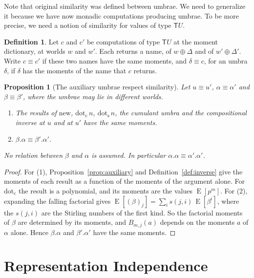 \documentclass[11pt,a4paper]{report}
\theoremstyle{plain}
\newtheorem{proposition}[theorem]{Proposition}
\theoremstyle{definition}
\newtheorem{definition}[theorem]{Definition}
\theoremstyle{remark}
\newcommand{\E}{\operatorname{E}}
\newcommand{\T}{\mathsf{T}}
\begin{document}
Note that original similarity was defined between umbrae. We need to 
generalize it because we have now monadic computations producing umbrae.
To be more precise, we need a notion of similarity for values of type $\T U$.

\begin{definition}
\label{def:similar-comp}
Let $c$ and $c'$ be computations of type $\T U$ at the moment dictionary, at
worlds $w$ and $w'$. Each returns a name, of $w \oplus \Delta$ and of
$w' \oplus \Delta'$. Write $c \equiv c'$ if these two names have the same
moments, and $\delta \equiv c$, for an umbra $\delta$, if $\delta$ has the moments
of the name that $c$ returns.
\end{definition}

\begin{proposition}[The auxiliary umbrae respect similarity]
\label{prop:similar}
Let $u \equiv u'$, $\alpha \equiv \alpha'$ and $\beta \equiv \beta'$, where the
umbrae may lie in different worlds.
\begin{enumerate}
\item The results of $\mathrm{new}$, $\mathrm{dot}_{\mathrm{c}}\,n$,
  $\mathrm{dot}_{\mathrm{s}}\,n$, the cumulant umbra and the compositional inverse
  at $u$ and at $u'$ have the same moments.
\item $\beta.\alpha \equiv \beta'.\alpha'$.
\end{enumerate}
No relation between $\beta$ and $\alpha$ is assumed. In particular
$\alpha.\alpha \equiv \alpha'.\alpha'$.
\end{proposition}

\begin{proof}
For (1), Proposition~\ref{prop:auxiliary} and Definition~\ref{def:inverse} give
the moments of each result as a function of the moments of the argument alone.
For $\mathrm{dot}_{\mathrm{c}}$ the result is a polynomial, and its moments are
the values $\E[p^m]$. For (2), expanding the falling factorial gives
$\E[(\beta)_j] = \sum_i s(j, i)\, \E[\beta^i]$, where the $s(j, i)$ are the
Stirling numbers of the first kind. So the factorial moments of $\beta$ are
determined by its moments, and $B_{m,j}(a)$ depends on the moments $a$ of
$\alpha$ alone. Hence $\beta.\alpha$ and $\beta'.\alpha'$ have the same moments.
\end{proof}

\section{Representation Independence}
\label{sec:repind}
\end{document}
